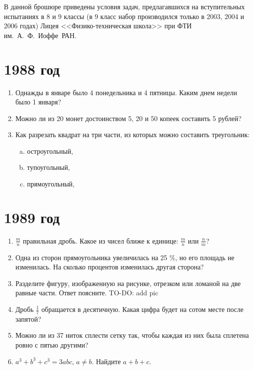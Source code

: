 \documentclass[12pt]{article}
\begin{document}
В данной брошюре приведены условия задач, предлагавшихся на
вступительных испытаниях в 8 и 9 классы (в 9 класс набор производился
только в 2003, 2004 и 2006 годах) Лицея <<Физико-техническая школа>> при
ФТИ им.~А.~Ф.~Иоффе~РАН.

\section*{1988 год}
\begin{enumerate}
    \item Однажды в январе было 4 понедельника и 4 пятницы. Каким днем недели было 1 января?
    \item Можно ли из 20 монет достоинством 5, 20 и 50 копеек составить 5 рублей?
    \item Как разрезать квадрат на три части, из которых можно составить треугольник:
    \begin{enumerate}[a)]
        \item остроугольный,
        \item тупоугольный,
        \item прямоугольный,
    \end{enumerate}
\end{enumerate}

\section* {1989 год}
\begin{enumerate}
    \item $\frac{m}{n}$ \textemdash правильная дробь.
    Какое из чисел ближе к единице: $\frac{m}{n}$ или $\frac{n}{m}$?
    \item  Одна из сторон прямоугольника увеличилась на 25 \%, но его площадь
не изменилась. На сколько процентов изменилась другая сторона?
    \item Разделите фигуру, изображенную на рисунке, отрезком или ломаной на две равные части. Ответ поясните. {\color{red} TO-DO: add pic}
    \item Дробь $\frac{1}{7}$ обращается в десятичную. Какая цифра будет на сотом месте после запятой?
    \item Можно ли из 37 ниток сплести сетку так, чтобы каждая из них была сплетена ровно с пятью другими? 
    \item  $a^3 + b^3 + c^3 = 3abc$, $a \ne b$. Найдите $a + b + c$.
\end{enumerate}
\end{document}
